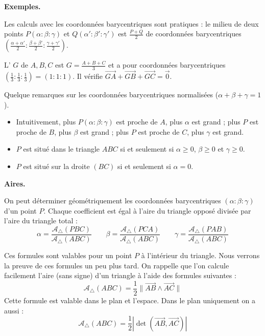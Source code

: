 \documentclass[11pt,class=report,crop=false]{standalone}
\begin{document}
\medskip
\textbf{Exemples.}



Les calculs avec les coordonnées barycentriques sont pratiques : le milieu de deux points $P(\alpha:\beta:\gamma)$
et $Q(\alpha':\beta':\gamma')$ est $\frac{P+Q}{2}$ de coordonnées barycentriques $(\frac{\alpha+\alpha'}{2}:\frac{\beta+\beta'}{2} :\frac{\gamma+\gamma'}{2})$.

L' $G$ de $A, B, C$ est $G = \frac{A+B+C}{3}$ et a pour coordonnées barycentriques $(\frac13:\frac13:\frac13) = (1:1:1)$.
Il vérifie $\vec{GA} + \vec{GB} + \vec{GC} = \vec{0}$.

Quelque remarques sur les coordonnées barycentriques normalisées ($\alpha+\beta+\gamma=1$).
\begin{itemize}
	\item Intuitivement, plus $P(\alpha:\beta:\gamma)$ est proche de $A$, plus $\alpha$ est grand ; plus $P$ est proche de $B$, plus $\beta$ est grand ; plus $P$ est proche de $C$, plus $\gamma$ est grand.
	\item $P$ est situé dans le triangle $ABC$ si et seulement si $\alpha\ge0$, $\beta\ge0$ et $\gamma\ge0$.
	\item $P$ est situé sur la droite $(BC)$ si et seulement si $\alpha=0$.
\end{itemize}


\medskip
\textbf{Aires.}

On peut déterminer géométriquement les coordonnées barycentriques $(\alpha:\beta:\gamma)$ d'un point $P$.
Chaque coefficient est égal à l'aire du triangle opposé divisée par l'aire du triangle total :
$$\alpha = \frac{\mathcal{A}_{\triangle}(PBC)}{\mathcal{A}_{\triangle}(ABC)}
\qquad
\beta = \frac{\mathcal{A}_{\triangle}(PCA)}{\mathcal{A}_{\triangle}(ABC)}
\qquad
\gamma = \frac{\mathcal{A}_{\triangle}(PAB)}{\mathcal{A}_{\triangle}(ABC)}$$





Ces formules sont valables pour un point $P$ à l'intérieur du triangle. Nous verrons la preuve de ces formules un peu plus tard.
On rappelle que l'on calcule facilement l'aire (sans signe) d'un triangle à l'aide des formules suivantes :
$$\mathcal{A}_{\triangle} (ABC) 
= \frac12 \| \vec{AB} \wedge \vec{AC} \|$$
Cette formule est valable dans le plan et l'espace.
Dans le plan uniquement on a aussi :
$$\mathcal{A}_{\triangle} (ABC) = \frac12 \left| \det(\vec{AB}, \vec{AC}) \right|$$
\end{document}
